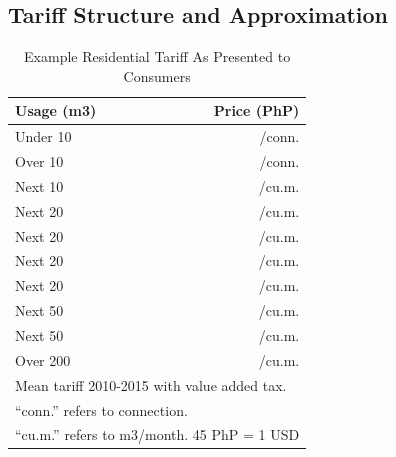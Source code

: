 \documentclass[12pt,table]{article}
\begin{document}
\pagebreak

\subsection{Tariff Structure and Approximation}\label{appendix:tariff}



\begin{table}
\centering
\caption{Example Residential Tariff As Presented to Consumers}\label{table:tarifftrue}
\vspace{-2mm}
\begin{tabular}{l*{1}{r}}
\toprule
Usage (m3) & Price (PhP) \\
\midrule
Under   10    &   /conn. \\
Over    10    &   /conn. \\
Next    10    &   /cu.m. \\
Next    20    &   /cu.m. \\
Next    20    &   /cu.m. \\
Next    20    &   /cu.m. \\
Next    20    &   /cu.m. \\
Next    50    &   /cu.m. \\
Next    50    &   /cu.m. \\
Over   200    &   /cu.m. \\
\bottomrule
\multicolumn{2}{l}{\scriptsize Mean tariff 2010-2015 with value added tax. }\\[-.5em]
\multicolumn{2}{l}{\scriptsize ``conn.'' refers to connection. }\\[-.5em]
\multicolumn{2}{l}{\scriptsize ``cu.m.'' refers to m3/month.   45 PhP = 1 USD }
\end{tabular}
\end{table}
\end{document}
